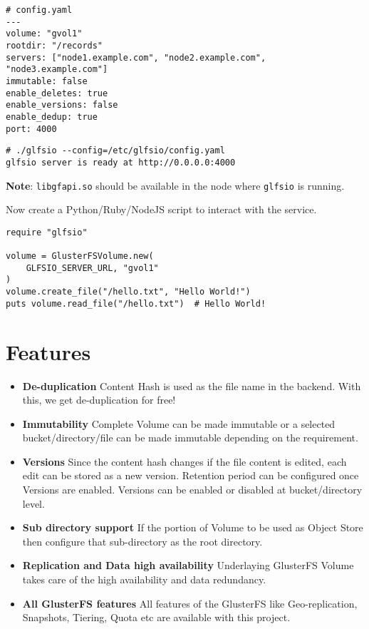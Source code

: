 \documentclass[10pt,a4paper]{article}
\begin{document}
\begin{multicols*}{2}
\begin{verbatim}
# config.yaml
---
volume: "gvol1"
rootdir: "/records"
servers: ["node1.example.com", "node2.example.com", "node3.example.com"]
immutable: false
enable_deletes: true
enable_versions: false
enable_dedup: true
port: 4000
\end{verbatim}

\begin{verbatim}
# ./glfsio --config=/etc/glfsio/config.yaml
glfsio server is ready at http://0.0.0.0:4000
\end{verbatim}

\textbf{Note}: \texttt{libgfapi.so} should be available in the node where \texttt{glfsio} is running.

Now create a Python/Ruby/NodeJS script to interact with the service.

\begin{verbatim}
require "glfsio"

volume = GlusterFSVolume.new(
    GLFSIO_SERVER_URL, "gvol1"
)
volume.create_file("/hello.txt", "Hello World!")
puts volume.read_file("/hello.txt")  # Hello World!
\end{verbatim}

\section{Features}
\begin{itemize}
\item \textbf{De-duplication} Content Hash is used as the file name in the backend. With this, we get de-duplication for free!
\item \textbf{Immutability} Complete Volume can be made immutable or a selected bucket/directory/file can be made immutable depending on the requirement.
\item \textbf{Versions} Since the content hash changes if the file content is edited, each edit can be stored as a new version. Retention period can be configured once Versions are enabled. Versions can be enabled or disabled at bucket/directory level.
\item \textbf{Sub directory support} If the portion of Volume to be used as Object Store then configure that sub-directory as the root directory.
\item \textbf{Replication and Data high availability} Underlaying GlusterFS Volume takes care of the high availability and data redundancy.
\item \textbf{All GlusterFS features} All features of the GlusterFS like Geo-replication, Snapshots, Tiering, Quota etc are available with this project.
\end{itemize}


\end{multicols*}
\end{document}

